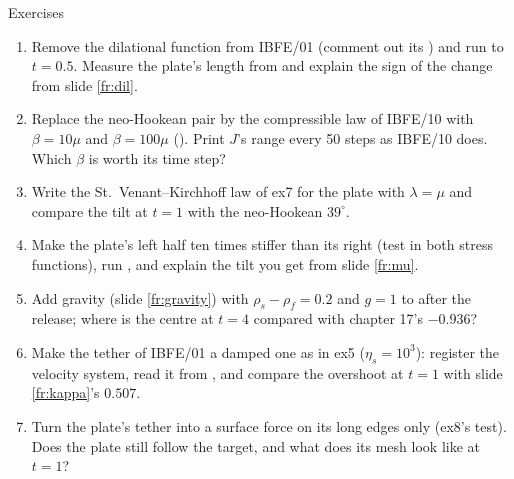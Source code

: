 \documentclass[aspectratio=169,11pt]{beamer}
\begin{document}
\begin{frame}{Exercises}
\label{fr:exercises}
\footnotesize
\begin{enumerate}
  \item Remove the dilational function from IBFE/01 (comment out its ) and run  to $t = 0.5$. Measure the plate's length from  and explain the sign of the change from slide \ref{fr:dil}.
  \item Replace the neo-Hookean pair by the compressible law of IBFE/10 with $\beta = 10\mu$ and $\beta = 100\mu$ (). Print $J$'s range every 50 steps as IBFE/10 does. Which $\beta$ is worth its time step?
  \item Write the St.\ Venant--Kirchhoff law of ex7 for the plate with $\lambda = \mu$ and compare the tilt at $t = 1$ with the neo-Hookean $39^\circ$.
  \item Make the plate's left half ten times stiffer than its right (test  in both stress functions), run , and explain the tilt you get from slide \ref{fr:mu}.
  \item Add gravity (slide \ref{fr:gravity}) with $\rho_s - \rho_f = 0.2$ and $g = 1$ to  after the release; where is the centre at $t = 4$ compared with chapter 17's $-0.936$?
  \item Make the tether of IBFE/01 a damped one as in ex5 ($\eta_s = 10^3$): register the velocity system, read it from , and compare the overshoot at $t = 1$ with slide \ref{fr:kappa}'s $0.507$.
  \item Turn the plate's tether into a surface force on its long edges only (ex8's  test). Does the plate still follow the target, and what does its mesh look like at $t = 1$?
\end{enumerate}
\end{frame}
\end{document}

